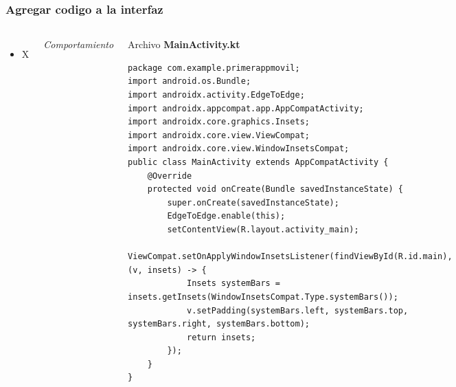 \begin{frame}[fragile]
\frametitle{Agregar codigo a la interfaz}  


\begin{columns}

\begin{itemize}
\item X
\end{itemize}

\textit{Comportamiento}
\begin{block}{Archivo \textbf{MainActivity.kt}}
\begin{verbatim}
package com.example.primerappmovil;
import android.os.Bundle;
import androidx.activity.EdgeToEdge;
import androidx.appcompat.app.AppCompatActivity;
import androidx.core.graphics.Insets;
import androidx.core.view.ViewCompat;
import androidx.core.view.WindowInsetsCompat;
public class MainActivity extends AppCompatActivity {
    @Override
    protected void onCreate(Bundle savedInstanceState) {
        super.onCreate(savedInstanceState);
        EdgeToEdge.enable(this);
        setContentView(R.layout.activity_main);
        ViewCompat.setOnApplyWindowInsetsListener(findViewById(R.id.main), (v, insets) -> {
            Insets systemBars = insets.getInsets(WindowInsetsCompat.Type.systemBars());
            v.setPadding(systemBars.left, systemBars.top, systemBars.right, systemBars.bottom);
            return insets;
        });
    }
}\end{verbatim}
\end{block}
\end{columns}
\end{frame}


